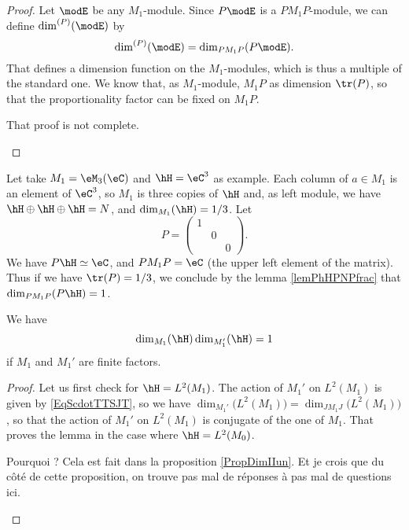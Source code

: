 \begin{proof}
Let $\modE$ be any $M_1$-module. Since $P\modE$ is a $PM_1P$-module, we can define $\dim^{(P)}(\modE)$ by
\begin{equation}
	\dim^{(P)}(\modE)=\dim_{PM_1P}(P\modE).
\end{equation}
That defines a dimension function on the $M_1$-modules, which is thus a multiple of the standard one. We know that, as $M_1$-module, $M_1P$ as dimension $\tr(P)$, so that the proportionality factor can be fixed on $M_1P$.

\begin{probleme}
	That proof is not complete.
\end{probleme}
\end{proof}

Let take $M_1=\eM_3(\eC)$ and $\hH=\eC^3$ as example. Each column of $a\in M_1$ is an element of $\eC^3$, so $M_1$ is three copies of $\hH$ and, as left module, we have $\hH\oplus\hH\oplus\hH=N$, and $\dim_{M_1}(\hH)=1/3$. Let
\[ 
	P=
\begin{pmatrix}
  1	&		&	\\ 
  	&	0	&	\\ 
 	&		& 0	  
\end{pmatrix}.
\]
We have $P\hH\simeq \eC$, and $PM_1P=\eC$ (the upper left element of the matrix). Thus if we have $\tr(P)=1/3$, we conclude by the lemma \ref{lemPhHPNPfrac} that $\dim_{PM_1P}(P\hH)=1$.

\begin{lemma}
We have
\begin{equation}
	\dim_{M_1}(\hH)\dim_{M_1'}(\hH)=1
\end{equation}
if $M_1$ and $M_1'$ are finite factors.
\end{lemma}

\begin{proof}
Let us first check for $\hH=L^2(M_1)$. The action of $M_1'$ on $L^2(M_1)$ is given by \eqref{EqScdotTTSJT}, so we have $\dim_{M_1'}\big( L^2(M_1) \big)=\dim_{JM_1J}\big( L^2(M_1) \big)$, so that the action of $M_1'$ on $L^2(M_1)$ is conjugate of the one of $M_1$. That proves the lemma in the case where $\hH=L^2(M_0)$.

\begin{probleme}
Pourquoi ? Cela est fait dans la proposition \ref{PropDimIIun}. Et je crois que du côté de cette proposition, on trouve pas mal de réponses à pas mal de questions ici.
\end{probleme}

\end{proof}

